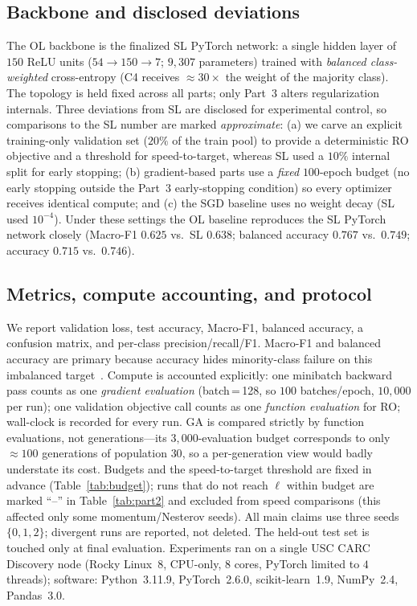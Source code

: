 \documentclass[letterpaper, 10pt, conference]{ieeeconf}
\begin{document}
\subsection{Backbone and disclosed deviations}
The OL backbone is the finalized SL PyTorch network: a single hidden layer of
$150$ ReLU units ($54{\to}150{\to}7$; $9{,}307$ parameters) trained with
\emph{balanced class-weighted} cross-entropy (C4 receives $\approx30\times$ the
weight of the majority class). The topology is held fixed across all parts; only
Part~3 alters regularization internals. Three deviations from SL are disclosed
for experimental control, so comparisons to the SL number are marked
\emph{approximate}: (a) we carve an explicit training-only validation set ($20\%$
of the train pool) to provide a deterministic RO objective and a threshold for
speed-to-target, whereas SL used a $10\%$ internal split for early stopping; (b)
gradient-based parts use a \emph{fixed} $100$-epoch budget (no early stopping
outside the Part~3 early-stopping condition) so every optimizer receives
identical compute; and (c) the SGD baseline uses no weight decay (SL used
$10^{-4}$). Under these settings the OL baseline reproduces the SL PyTorch
network closely (Macro-F1 $0.625$ vs.\ SL $0.638$; balanced accuracy $0.767$
vs.\ $0.749$; accuracy $0.715$ vs.\ $0.746$).

\subsection{Metrics, compute accounting, and protocol}
We report validation loss, test accuracy, Macro-F1, balanced accuracy, a
confusion matrix, and per-class precision/recall/F1. Macro-F1 and balanced
accuracy are primary because accuracy hides minority-class failure on this
imbalanced target~\cite{sokolova2009,he2009}. Compute is accounted explicitly:
one minibatch backward pass counts as one \emph{gradient evaluation}
(batch\,=\,128, so $100$ batches/epoch, $10{,}000$ per run); one validation
objective call counts as one \emph{function evaluation} for RO; wall-clock is
recorded for every run. GA is compared strictly by function evaluations, not
generations---its $3{,}000$-evaluation budget corresponds to only
$\approx\!100$ generations of population $30$, so a per-generation view would
badly understate its cost. Budgets and the speed-to-target threshold are fixed
in advance (Table~\ref{tab:budget}); runs that do not reach $\ell$ within budget
are marked ``--'' in Table~\ref{tab:part2} and excluded from speed comparisons
(this affected only some momentum/Nesterov seeds). All main claims use three
seeds $\{0,1,2\}$; divergent runs are reported, not deleted. The held-out test
set is touched only at final evaluation. Experiments ran on a single USC CARC
Discovery node (Rocky Linux~8, CPU-only, $8$ cores, PyTorch limited to $4$
threads); software: Python~3.11.9, PyTorch~2.6.0, scikit-learn~1.9, NumPy~2.4,
Pandas~3.0.
\end{document}
